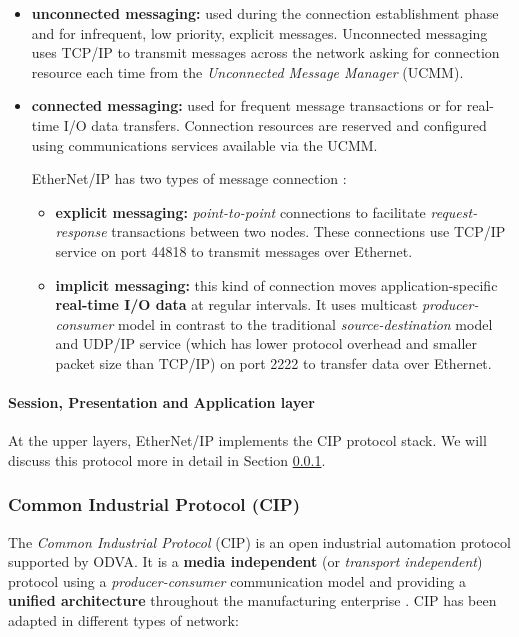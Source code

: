 \begin{itemize}
	\item \textbf{unconnected messaging:} used during the connection establishment phase and for infrequent, low priority, explicit messages. Unconnected messaging uses TCP/IP to transmit messages across the network asking for connection resource each time from the \textit{Unconnected Message Manager} (UCMM).
	
	\item \textbf{connected messaging:} used for frequent message transactions or for real-time I/O data transfers. Connection resources are reserved and configured using communications services available via the UCMM.
	
	\bigskip
	EtherNet/IP has two types of message connection \cite{enip_pdf}:
	\begin{itemize}
		\item \textbf{explicit messaging:} \textit{point-to-point} connections to facilitate \textit{request-response} transactions between two nodes. These connections use TCP/IP service on port 44818 to transmit messages over Ethernet.
		
		\item \textbf{implicit messaging:} this kind of connection moves application-specific \textbf{real-time I/O data} at regular intervals. It uses multicast \textit{producer-consumer} model in contrast to the traditional \textit{source-destination} model and UDP/IP service (which has lower protocol overhead and smaller packet size than TCP/IP) on port 2222 to transfer data over Ethernet. 
	\end{itemize}
\end{itemize}

\paragraph{Session, Presentation and Application layer} At the upper layers, EtherNet/IP implements the CIP protocol stack. We will discuss this protocol more in detail in Section \ref{subsubsec:2_cip}. 

\subsubsection{Common Industrial Protocol (CIP)}
\label{subsubsec:2_cip}
The \textit{Common Industrial Protocol} (CIP) is an open industrial automation protocol supported by ODVA. It is a \textbf{media independent} (or \textit{transport independent}) protocol using a \textit{producer-consumer} communication model and providing a \textbf{unified architecture} throughout the manufacturing enterprise \cite{cip_protocol_web}\cite{cip_wiki}.\newline
CIP has been adapted in different types of network:

